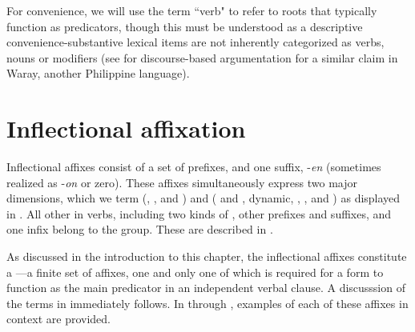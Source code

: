 For convenience, we will use the term “verb" to refer to roots that typically function as predicators, though this must be understood as a descriptive conve\-nience-substantive lexical items are not inherently categorized as verbs, nouns or modifiers (see \citealt{oyzon2021} for discourse-based argumentation for a similar claim in Waray, another Philippine language).

\section{Inflectional affixation}
\label{bkm:Ref58564378} \label{bkm:Ref59351065} \label{sec:verbinflection}
 Inflectional affixes consist of a set of prefixes, and one suffix, -\textit{en} (sometimes realized as -\textit{on} or zero). These affixes simultaneously express two major dimensions, which we term  (, , and ) and  ( and , dynamic, , , and ) as displayed in . All other  in verbs, including two kinds of , other prefixes and suffixes, and one infix belong to the  group. These are described in .

As discussed in the introduction to this chapter, the inflectional affixes constitute a ---a finite set of affixes, one and only one of which is required for a form to function as the main predicator in an independent verbal clause. A discusssion of the terms in  immediately follows. In  through , examples of each of these affixes in context are provided.


